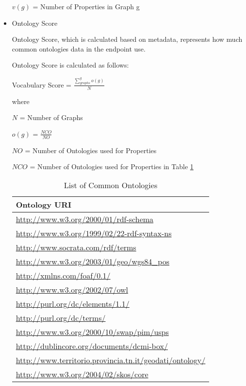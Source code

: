 \documentclass[11pt,a4paper]{article}
\begin{document}
\begin{itemize}
\begin{mdframed}
$v(g)$ = Number of Properties in Graph g

  \end{mdframed}

\item Ontology Score

  Ontology Score, which is calculated based on metadata, represents how much common ontologies data in the endpoint use.

  Ontology Score is calculated as follows:

  \begin{mdframed}
    \center

Vocabulary Score = $\frac{\displaystyle \sum_{graphs}^{g}o(g)}{N}$

where

$N$ = Number of Graphs

$o(g)$ = $\frac{NCO}{NO}$

$NO$ = Number of Ontologies used for Properties

$NCO$ = Number of Ontologies used for Properties in Table \ref{table:common_ontologies}

  \end{mdframed}

  \begin{table}[htbp]
    \center
    \begin{tabular}{|l|}
      \hline
      Ontology URI \\
      \hline
      \url{http://www.w3.org/2000/01/rdf-schema} \\
      \url{http://www.w3.org/1999/02/22-rdf-syntax-ns} \\
      \url{http://www.socrata.com/rdf/terms} \\
      \url{http://www.w3.org/2003/01/geo/wgs84_pos} \\
      \url{http://xmlns.com/foaf/0.1/} \\
      \url{http://www.w3.org/2002/07/owl} \\
      \url{http://purl.org/dc/elements/1.1/} \\
      \url{http://purl.org/dc/terms/} \\
      \url{http://www.w3.org/2000/10/swap/pim/usps} \\
      \url{http://dublincore.org/documents/dcmi-box/} \\
      \url{http://www.territorio.provincia.tn.it/geodati/ontology/} \\
      \url{http://www.w3.org/2004/02/skos/core} \\
      \hline
    \end{tabular}
    \caption{List of Common Ontologies}
    \label{table:common_ontologies}
  \end{table}

\end{itemize}
\end{document}
